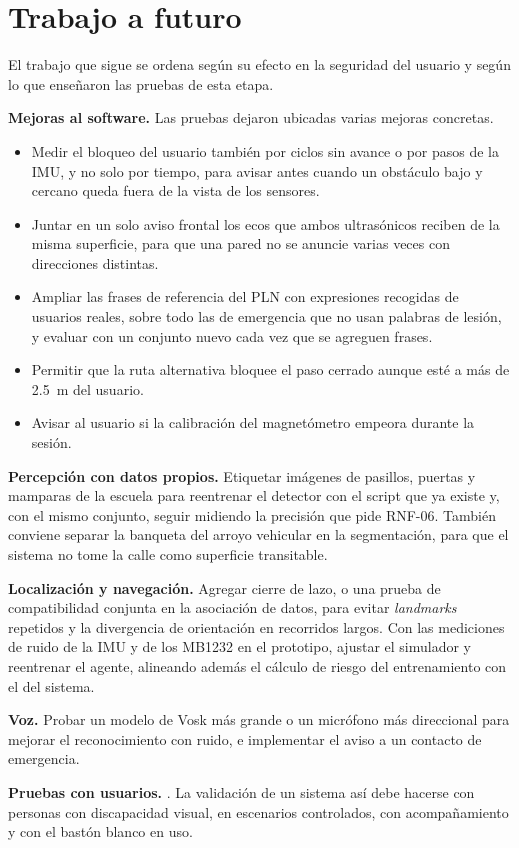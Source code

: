 \section{Trabajo a futuro}
\label{sec:trabajo_futuro}

El trabajo que sigue se ordena según su efecto en la seguridad del usuario y según lo
que enseñaron las pruebas de esta etapa.

\textbf{Mejoras al software.} Las pruebas dejaron ubicadas varias mejoras concretas.

\begin{itemize}
    \item Medir el bloqueo del usuario también por ciclos sin avance o por pasos de la
    IMU, y no solo por tiempo, para avisar antes cuando un obstáculo bajo y cercano
    queda fuera de la vista de los sensores.
    \item Juntar en un solo aviso frontal los ecos que ambos ultrasónicos reciben de la
    misma superficie, para que una pared no se anuncie varias veces con direcciones
    distintas.
    \item Ampliar las frases de referencia del PLN con expresiones recogidas de usuarios
    reales, sobre todo las de emergencia que no usan palabras de lesión, y evaluar con un
    conjunto nuevo cada vez que se agreguen frases.
    \item Permitir que la ruta alternativa bloquee el paso cerrado aunque esté a más de
    2.5~m del usuario.
    \item Avisar al usuario si la calibración del magnetómetro empeora durante la
    sesión.
\end{itemize}

\textbf{Percepción con datos propios.} Etiquetar imágenes de pasillos, puertas y mamparas
de la escuela para reentrenar el detector con el script que ya existe y, con el mismo
conjunto, seguir midiendo la precisión que pide RNF-06. También conviene separar la
banqueta del arroyo vehicular en la segmentación, para que el sistema no tome la calle
como superficie transitable.

\textbf{Localización y navegación.} Agregar cierre de lazo, o una prueba de
compatibilidad conjunta en la asociación de datos, para evitar \emph{landmarks}
repetidos y la divergencia de orientación en recorridos largos. Con las mediciones de
ruido de la IMU y de los MB1232 en el prototipo, ajustar el simulador y reentrenar el
agente, alineando además el cálculo de riesgo del entrenamiento con el del sistema.

\textbf{Voz.} Probar un modelo de Vosk más grande o un micrófono más direccional para
mejorar el reconocimiento con ruido, e implementar el aviso a un contacto de emergencia.

\textbf{Pruebas con usuarios.} . La validación de un sistema así
debe hacerse con personas con discapacidad visual, en escenarios controlados, con
acompañamiento y con el bastón blanco en uso.
